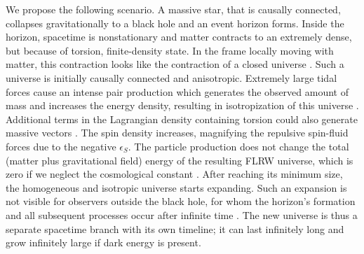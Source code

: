 \documentclass[prd,onecolumn,nofootinbib,showkeys]{revtex4}
\begin{document}
We propose the following scenario.
A massive star, that is causally connected, collapses gravitationally to a black hole and an event horizon forms.
Inside the horizon, spacetime is nonstationary and matter contracts to an extremely dense, but because of torsion, finite-density state.
In the frame locally moving with matter, this contraction looks like the contraction of a closed universe \cite{LL,Tol}.
Such a universe is initially causally connected and anisotropic.
Extremely large tidal forces cause an intense pair production which generates the observed amount of mass and increases the energy density, resulting in isotropization of this universe \cite{part1,part2,part3}.
Additional terms in the Lagrangian density containing torsion could also generate massive vectors \cite{Niko3}.
The spin density increases, magnifying the repulsive spin-fluid forces due to the negative $\epsilon_S$.
The particle production does not change the total (matter plus gravitational field) energy of the resulting FLRW universe, which is zero if we neglect the cosmological constant \cite{CI}.
After reaching its minimum size, the homogeneous and isotropic universe starts expanding.
Such an expansion is not visible for observers outside the black hole, for whom the horizon's formation and all subsequent processes occur after infinite time \cite{LL}.
The new universe is thus a separate spacetime branch with its own timeline; it can last infinitely long and grow infinitely large if dark energy is present.
\end{document}
